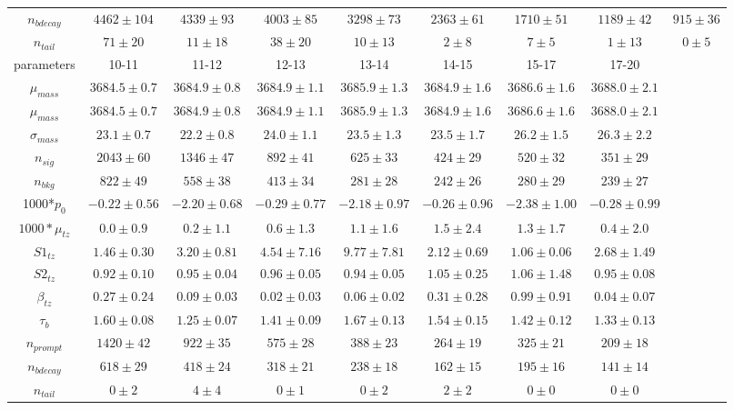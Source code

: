 \begin{sidewaystable}[h]
\begin{center}
{\begin{tabular}{c|cccccccc}
$n_{bdecay}$  & $4462\pm104$ & $4339\pm93$ & $4003\pm85$ & $3298\pm73$ & $2363\pm61$ & $1710\pm51$ & $1189\pm42$ & $915\pm36$\\
$n_{tail}$  & $71\pm20$ & $11\pm18$ & $38\pm20$ & $10\pm13$ & $2\pm8$ & $7\pm5$ & $1\pm13$ & $0\pm5$\\
 \hline
parameters  &  10-11 & 11-12 & 12-13 & 13-14  & 14-15 & 15-17 & 17-20  \\ \hline
$\mu_{mass}$  & $3684.5\pm0.7$ & $3684.9\pm0.8$ & $3684.9\pm1.1$ & $3685.9\pm1.3$ & $3684.9\pm1.6$ & $3686.6\pm1.6$ & $3688.0\pm2.1$\\
$\mu_{mass}$  & $3684.5\pm0.7$ & $3684.9\pm0.8$ & $3684.9\pm1.1$ & $3685.9\pm1.3$ & $3684.9\pm1.6$ & $3686.6\pm1.6$ & $3688.0\pm2.1$\\
$\sigma_{mass}$  & $23.1\pm0.7$ & $22.2\pm0.8$ & $24.0\pm1.1$ & $23.5\pm1.3$ & $23.5\pm1.7$ & $26.2\pm1.5$ & $26.3\pm2.2$\\
$n_{sig}$  & $2043\pm60$ & $1346\pm47$ & $892\pm41$ & $625\pm33$ & $424\pm29$ & $520\pm32$ & $351\pm29$\\
$n_{bkg}$  & $822\pm49$ & $558\pm38$ & $413\pm34$ & $281\pm28$ & $242\pm26$ & $280\pm29$ & $239\pm27$\\
1000*$p_{0}$  & $-0.22\pm0.56$ & $-2.20\pm0.68$ & $-0.29\pm0.77$ & $-2.18\pm0.97$ & $-0.26\pm0.96$ & $-2.38\pm1.00$ & $-0.28\pm0.99$\\
$1000*\mu_{tz}$  & $0.0\pm0.9$ & $0.2\pm1.1$ & $0.6\pm1.3$ & $1.1\pm1.6$ & $1.5\pm2.4$ & $1.3\pm1.7$ & $0.4\pm2.0$\\
$S1_{tz}$  & $1.46\pm0.30$ & $3.20\pm0.81$ & $4.54\pm7.16$ & $9.77\pm7.81$ & $2.12\pm0.69$ & $1.06\pm0.06$ & $2.68\pm1.49$\\
$S2_{tz}$  & $0.92\pm0.10$ & $0.95\pm0.04$ & $0.96\pm0.05$ & $0.94\pm0.05$ & $1.05\pm0.25$ & $1.06\pm1.48$ & $0.95\pm0.08$\\
$\beta_{tz}$  & $0.27\pm0.24$ & $0.09\pm0.03$ & $0.02\pm0.03$ & $0.06\pm0.02$ & $0.31\pm0.28$ & $0.99\pm0.91$ & $0.04\pm0.07$\\
$\tau_{b}$  & $1.60\pm0.08$ & $1.25\pm0.07$ & $1.41\pm0.09$ & $1.67\pm0.13$ & $1.54\pm0.15$ & $1.42\pm0.12$ & $1.33\pm0.13$\\
$n_{prompt}$  & $1420\pm42$ & $922\pm35$ & $575\pm28$ & $388\pm23$ & $264\pm19$ & $325\pm21$ & $209\pm18$\\
$n_{bdecay}$  & $618\pm29$ & $418\pm24$ & $318\pm21$ & $238\pm18$ & $162\pm15$ & $195\pm16$ & $141\pm14$\\
$n_{tail}$  & $0\pm2$ & $4\pm4$ & $0\pm1$ & $0\pm2$ & $2\pm2$ & $0\pm0$ & $0\pm0$\\
\hline
\end{tabular}
}
\end{center} 
\end{sidewaystable}  




